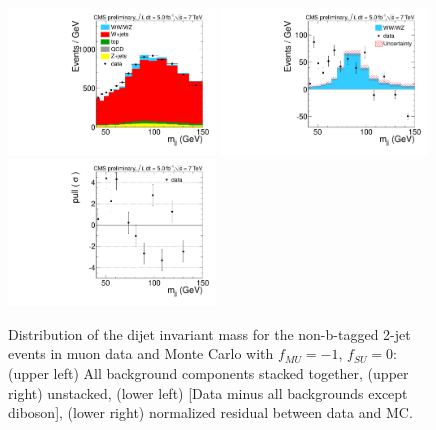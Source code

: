\begin{figure}[h!]
  {\centering
    \includegraphics[width=0.49\textwidth]{figs/ScaleAndMatchingCrossChecks/mu2JNoBTag_fSU0fMUm1/Wjj_Diboson_Muon_2jets_Stacked.pdf}
    \includegraphics[width=0.49\textwidth]{figs/ScaleAndMatchingCrossChecks/mu2JNoBTag_fSU0fMUm1/Wjj_Diboson_Muon_2jets_Subtracted.pdf}
    \includegraphics[width=0.49\textwidth]{figs/ScaleAndMatchingCrossChecks/mu2JNoBTag_fSU0fMUm1/Wjj_Diboson_Muon_2jets_Pull.pdf}
    \caption{Distribution of the dijet invariant mass for the non-b-tagged 2-jet events in muon data and Monte Carlo with $f_{MU}=-1$, $f_{SU}=0$: 
      (upper left) All background components stacked together, 
      (upper right) unstacked, (lower left) [Data minus all backgrounds except diboson],  
      (lower right) normalized residual between data and MC. }
    \label{fig:fsufmuXcheck_fSU0fMUm1}}
\end{figure}
